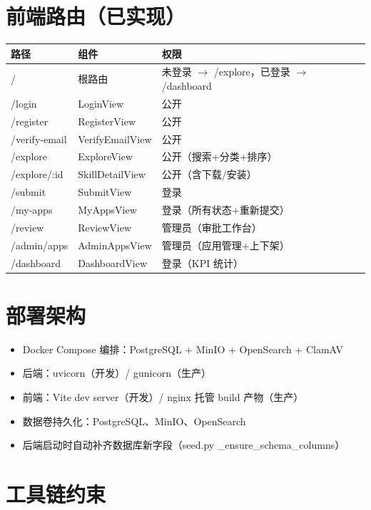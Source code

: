\documentclass[11pt,a4paper]{article}
\begin{document}
\section{前端路由（已实现）}

\begin{table}[h]
\centering
\begin{tabularx}{\linewidth}{llX}
\toprule
\textbf{路径} & \textbf{组件} & \textbf{权限} \\
\midrule
/ & 根路由 & 未登录 $\to$ /explore，已登录 $\to$ /dashboard \\
/login & LoginView & 公开 \\
/register & RegisterView & 公开 \\
/verify-email & VerifyEmailView & 公开 \\
/explore & ExploreView & 公开（搜索+分类+排序） \\
/explore/:id & SkillDetailView & 公开（含下载/安装） \\
/submit & SubmitView & 登录 \\
/my-apps & MyAppsView & 登录（所有状态+重新提交） \\
/review & ReviewView & 管理员（审批工作台） \\
/admin/apps & AdminAppsView & 管理员（应用管理+上下架） \\
/dashboard & DashboardView & 登录（KPI 统计） \\
\bottomrule
\end{tabularx}
\end{table}

\section{部署架构}

\begin{itemize}[nosep]
  \item Docker Compose 编排：PostgreSQL + MinIO + OpenSearch + ClamAV
  \item 后端：uvicorn（开发）/ gunicorn（生产）
  \item 前端：Vite dev server（开发）/ nginx 托管 build 产物（生产）
  \item 数据卷持久化：PostgreSQL、MinIO、OpenSearch
  \item 后端启动时自动补齐数据库新字段（seed.py \_ensure\_schema\_columns）
\end{itemize}

\section{工具链约束}
\end{document}
